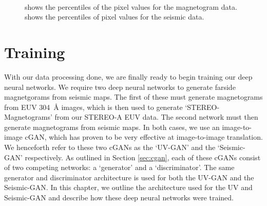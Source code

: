 \documentclass[11pt,a4paper,onecolumn]{report}
\begin{document}
\begin{figure}[t]%
  \\
  \caption[]{ shows the percentiles of the pixel values for
  the magnetogram data.  shows the percentiles of pixel
  values for the seismic data.}
  \label{fig:hmi_seismic_p}
\end{figure}


%
%
%
%
%
%
%
%
\chapter{Training}
\label{chap:training}
%
%
%
%
%
%
%
%
With our data processing done, we are finally ready to begin training our deep
neural networks.
We require two deep neural networks to generate farside magnetgorams from
seismic maps. The first of these must generate magnetograms from EUV
\SI{304}{\angstrom} images, which is then used to generate `STEREO-Magnetograms'
from our STEREO-A EUV data. The second network must then generate magnetograms
from seismic maps. In both cases, we use an image-to-image cGAN, which has
proven to be very effective at image-to-image translation. We henceforth refer
to these two cGANs as the `UV-GAN' and the `Seismic-GAN' respectively. As
outlined in Section \ref{sec:cgan}, each of these cGANs consist of two competing
networks: a `generator' and a `discriminator'. The same generator and
discriminator architecture is used for both the UV-GAN and the Seismic-GAN. In
this chapter, we outline the architecture used for the UV and Seismic-GAN and
describe how these deep neural networks were trained.
\end{document}
